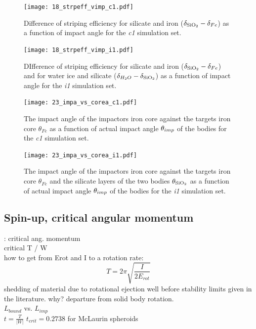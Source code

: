 \begin{landscape}
\begin{figure}[htbp]
\begin{center}
\texttt{[image: 18\_strpeff\_vimp\_c1.pdf]}
\caption{Difference of striping efficiency for silicate and iron ($\delta_{\mathrm{SiO}_2} - \delta_{Fe}$) as a function of impact angle for the \emph{c1} simulation set.}
\label{ch03_fig18a}
\end{center}
\end{figure}

\begin{figure}[htbp]
\begin{center}
\texttt{[image: 18\_strpeff\_vimp\_i1.pdf]}
\caption{DIfference of striping efficiency for silicate and iron ($\delta_{\mathrm{SiO}_2} - \delta_{Fe}$) and for water ice and silicate ($\delta_{H_2 O} - \delta_{\mathrm{SiO}_2}$) as a function of impact angle for the \emph{i1} simulation set.}
\label{ch03_fig19a}
\end{center}
\end{figure}

\begin{figure}[htbp]
\begin{center}
\texttt{[image: 23\_impa\_vs\_corea\_c1.pdf]}
\caption{The impact angle of the impactors iron core against the targets iron core $\theta_{Fe}$ as a function of actual impact angle $\theta_{imp}$ of the bodies for the \emph{c1} simulation set.}
\label{ch03_fig23a}
\end{center}
\end{figure}

\begin{figure}[htbp]
\begin{center}
\texttt{[image: 23\_impa\_vs\_corea\_i1.pdf]}
\caption{The impact angle of the impactors iron core against the targets iron core $\theta_{Fe}$ and the silicate layers of the two bodies $\theta_{\mathrm{SiO}_2}$ as a function of actual impact angle $\theta_{imp}$ of the bodies for the \emph{i1} simulation set.}
\label{ch03_fig23b}
\end{center}
\end{figure}
\end{landscape}



\subsection{Spin-up, critical angular momentum}
\cite{Canup:2000p3542}: critical ang. momentum\\
critical T / W \\
how to get from Erot and I to a rotation rate:
\begin{equation}
T = 2 \pi \sqrt{ \frac{I}{2 E_{rot}} }
\end{equation}
shedding of material due to rotational ejection well before stability limits given in the literature. why? departure from solid body rotation.\\
$L_{bound}$ vs. $L_{imp}$ \\
$t = \frac{T}{|W|}$
$t_{crit} = 0.2738$ for McLaurin spheroids \citep{1987gady.book.....B} \citep{chandrasekhar1969ellipsoidal}

